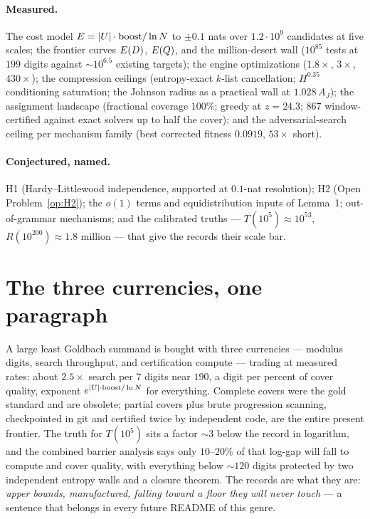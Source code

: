 \paragraph{Measured.} The cost model $E=|U|\cdot\mathrm{boost}/\ln N$
to $\pm0.1$ nats over $1.2\cdot10^9$ candidates at five scales; the
frontier curves $E(D)$, $E(Q)$, and the million-desert wall
($10^{85}$ tests at $199$ digits against $\sim10^{6.5}$ existing
targets); the engine optimizations ($1.8\times$, $3\times$,
$430\times$); the compression ceilings (entropy-exact $k$-list
cancellation; $H^{0.35}$ conditioning saturation; the Johnson radius as
a practical wall at $1.028\,A_J$); the assignment landscape (fractional
coverage $100\%$; greedy at $z=24.3$; $867$ window-certified against
exact solvers up to half the cover); and the adversarial-search ceiling
per mechanism family (best corrected fitness $0.0919$, $53\times$ short).

\paragraph{Conjectured, named.} H1 (Hardy--Littlewood independence,
supported at $0.1$-nat resolution); H2
(Open Problem~\ref{op:H2}); the $o(1)$ terms and equidistribution
inputs of Lemma~1; out-of-grammar mechanisms; and the calibrated truths
--- $T(10^5)\approx10^{53}$, $R(10^{200})\approx1.8$ million --- that
give the records their scale bar.

\section{The three currencies, one paragraph}\label{sec:currencies}

A large least Goldbach summand is bought with three currencies ---
modulus digits, search throughput, and certification compute --- trading
at measured rates: about $2.5\times$ search per $7$ digits near
$190$, a digit per percent of cover quality, exponent
$e^{|U|\cdot\mathrm{boost}/\ln N}$ for everything. Complete covers were
the gold standard and are obsolete; partial covers plus brute
progression scanning, checkpointed in git and certified twice by
independent code, are the entire present frontier. The truth for
$T(10^5)$ sits a factor $\sim$3 below the record in logarithm, and the
combined barrier analysis says only $10$--$20\%$ of that log-gap will
fall to compute and cover quality, with everything below
$\sim$$120$ digits protected by two independent entropy walls and a
closure theorem. The records are what they are: \emph{upper bounds,
manufactured, falling toward a floor they will never touch} --- a
sentence that belongs in every future README of this genre.

